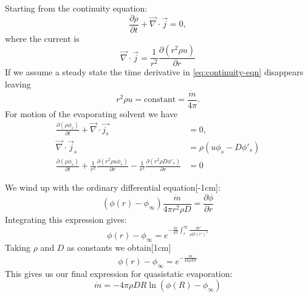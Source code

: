 \documentclass[12pt]{report}
\begin{document}
Starting from the continuity equation:
\begin{equation}\label{eq:continuity-eqn}
  \frac{\partial \rho}{\partial t}
  + \vec{\nabla} \cdot \vec{j} = 0,
\end{equation}
where the current is
\begin{equation}
  \vec{\nabla} \cdot \vec{j} =
  \frac{1}{r^2} \frac{\partial (r^2 \rho u)}{\partial r}
\end{equation}
If we assume a steady state the time derivative in \eqref{eq:continuity-eqn} disappears leaving
\begin{equation}
  r ^2 \rho u = \textrm{constant} = \frac{\dot{m}}{4\pi}.
\end{equation}
For motion of the evaporating solvent we have
\begin{align}
  \frac{\partial (\rho\phi_s)}{\partial t}
  + \vec{\nabla} \cdot \vec{j_s} &= 0, \\
  \vec{\nabla} \cdot \vec{j}_s &=
  \rho (u \phi_s - D \phi'_s) \\
  \frac{\partial (\rho\phi_s)}{\partial t}
  + \frac{1}{r^2} \frac{\partial (r^2 \rho u \phi_s)}{\partial r}
  - \frac{1}{r^2} \frac{\partial (r^2 \rho D \phi'_s)}{\partial r} &= 0
\end{align}

We wind up with the ordinary differential equation[-1cm]:
\begin{equation}
  (\phi(r) - \phi_\infty) \frac{\dot{m}}{4\pi r^2 \rho D}
    = \frac{\partial \phi}{\partial r}
\end{equation}
Integrating this expression gives:
\begin{equation}
  \phi(r) - \phi_\infty =
  e^{-\frac{\dot{m}}{4\pi} \int_r^\infty \frac{dr'}{\rho D (r')^2}}
\end{equation}
Taking $\rho$ and $D$ as constants we obtain[1cm]
\begin{equation}
  \phi(r) - \phi_\infty =
  e^{-\frac{\dot{m}}{4\pi \rho D r}}
\end{equation}
This gives us our final expression for quasistatic evaporation:
\begin{equation}
  \dot{m} = - 4\pi \rho D R \ln{(\phi(R) - \phi_\infty)}
\end{equation}
\end{document}
